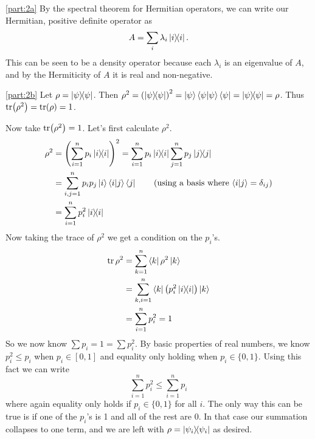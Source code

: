 \documentclass[boxes,pages]{homework}
\begin{document}
\begin{solution}
	\ref{part:2a}
	By the spectral theorem for Hermitian operators, we can write our Hermitian, positive definite operator as
	\begin{equation*}
		A = \sum_i\lambda_i\ketbra{i}{i}.
	\end{equation*}
	This can be seen to be a density operator because each $\lambda_i$ is an eigenvalue of $A$, and by the Hermiticity of $A$ it is real and non-negative.

	\ref{part:2b}
	Let $\rho = \ketbra{\psi}{\psi}$. Then $\rho^2 = \qty(\ketbra{\psi}{\psi})^2 = \ket{\psi}\braket{\psi}{\psi}\bra{\psi} = \ketbra{\psi}{\psi} = \rho$. Thus $\tr(\rho^2) = \tr(\rho) = 1$.

	Now take $\tr(\rho^2) = 1$. Let's first calculate $\rho^2$.
	\begin{align*}
		\rho^2 & = \qty(\sum_{i = 1}^n p_i\ketbra{i}{i})^2 = \sum_{i = 1}^n p_i\ketbra{i}{i}\sum_{j = 1}^n p_j\ketbra{j}{j}   \\
		       & = \sum_{i,j = 1}^n p_ip_j\ket{i}\braket{i}{j}\bra{j} \tag{using a basis where $\braket{i}{j} = \delta_{ij}$} \\
		       & = \sum_{i = 1}^n p_i^2\ketbra{i}{i}
	\end{align*}
	Now taking the trace of $\rho^2$ we get a condition on the $p_i$'s.
	\begin{align*}
		\tr \rho^2 & = \sum_{k = 1}^n\bra{k}\rho^2\ket{k}                     \\
		           & = \sum_{k,i = 1}^n\bra{k}\qty(p_i^2\ketbra{i}{i})\ket{k} \\
		           & = \sum_{i = 1}^n p_i^2 = 1
	\end{align*}
	So we now know $\sum p_i = 1 = \sum p_i^2$. By basic properties of real numbers, we know $p_i^2 \leq p_i$ when $p_i\in[0, 1]$ and equality only holding when $p_i \in\{0, 1\}$. Using this fact we can write
	\begin{equation*}
		\sum_{i = 1}^n p_i^2 \leq \sum_{i = 1}^n p_i
	\end{equation*}
	where again equality only holds if $p_i\in\{0, 1\}$ for all $i$. The only way this can be true is if one of the $p_i$'s is 1 and all of the rest are 0. In that case our summation collapses to one term, and we are left with $\rho = \ketbra{\psi_i}{\psi_i}$ as desired.


\end{solution}
\end{document}
